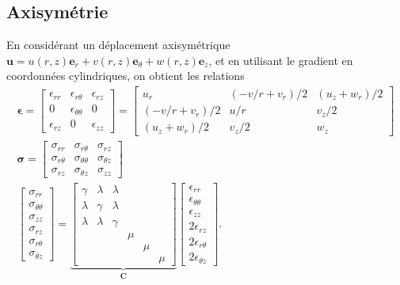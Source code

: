 \documentclass[12pt]{article}
\newcommand{\uu}{\mathbf{u}}
\newcommand{\stress}{\boldsymbol{\sigma}}
\newcommand{\strain}{\boldsymbol{\epsilon}}
\begin{document}
\subsection{Axisymétrie}
En considérant un déplacement axisymétrique 
$\uu = u(r,z)\mathbf{e}_r + v(r,z) \mathbf{e}_{\theta} + w(r,z)\mathbf{e}_z$,
et en utilisant le gradient en coordonnées cylindriques, on obtient les 
relations
\begin{gather}
    \strain =
    \begin{bmatrix}
        \epsilon_{rr} & \epsilon_{r\theta} & \epsilon_{rz}\\
        0 & \epsilon_{\theta \theta} & 0\\
        \epsilon_{rz} & 0 & \epsilon_{zz}
    \end{bmatrix}
    =
    \begin{bmatrix}
        u_r & (-v/r+v_r)/2 & (u_z + w_r)/2\\
        (-v/r+v_r)/2 & u/r & v_z / 2\\
        (u_z + w_r)/2 & v_z / 2 & w_z
    \end{bmatrix}\label{eq:axisymStrain}
    \\[1em]
    \stress =
    \begin{bmatrix}
        \sigma_{rr} & \sigma_{r\theta} & \sigma_{rz}\\
        \sigma_{r\theta} & \sigma_{\theta \theta} & \sigma_{\theta z}\\
        \sigma_{rz} & \sigma_{\theta z} & \sigma_{zz}
    \end{bmatrix}\\[1em]
    \begin{bmatrix}
        \sigma_{rr}\\
        \sigma_{\theta\theta}\\
        \sigma_{zz}\\
        \sigma_{rz}\\
        \sigma_{r\theta}\\
        \sigma_{\theta z}
    \end{bmatrix} = 
    \underbrace{
    \begin{bmatrix}
        \gamma & \lambda & \lambda &  &  & \\
        \lambda & \gamma & \lambda &  &  & \\
        \lambda & \lambda & \gamma &  &  & \\
         &  &  & \mu &  & \\
         &  &  &  & \mu & \\
         &  &  &  &  & \mu
    \end{bmatrix}}_{\mathbf{C}}
    \begin{bmatrix}
        \epsilon_{rr}\\
        \epsilon_{\theta\theta}\\
        \epsilon_{zz}\\
        2\epsilon_{rz}\\
        2\epsilon_{r\theta}\\
        2\epsilon_{\theta z}
    \end{bmatrix}.
\end{gather}
\end{document}

